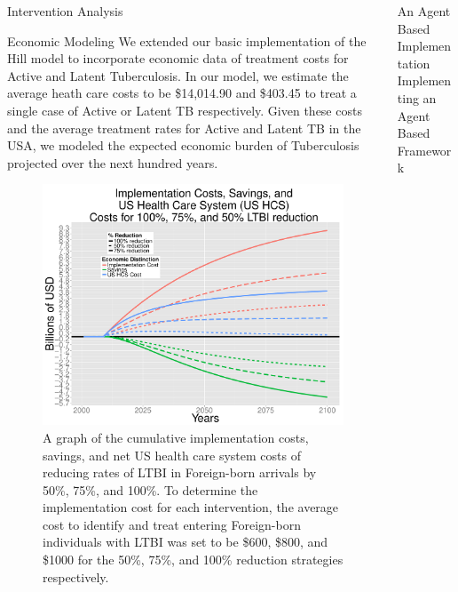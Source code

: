 \documentclass[final]{beamer}
\begin{document}
\begin{frame}
\begin{columns}
\begin{column}{.3\textwidth}
\begin{block}{Intervention Analysis}
\begin{figure}[h]
          \label{fig:redEnLTBI_costs}
        \end{figure}
      \end{block}
      \begin{block}{Economic Modeling}
        We extended our basic implementation of the Hill model to incorporate
        economic data of treatment costs for Active and Latent Tuberculosis.  
        In our model, we estimate the average heath care costs to be \$14,014.90
        and \$403.45 to treat a single case of Active or Latent TB respectively.  
        Given these costs and the average treatment rates for Active and Latent
        TB in the USA, we modeled the expected economic burden of Tuberculosis
        projected over the next hundred years.  

        \begin{figure}[h]
          \begin{center}
            \includegraphics[scale=1]{EnLTBIRedGroupCost.pdf}
          \end{center}
          \caption{A graph of the cumulative implementation costs, savings, and 
                       net US health care system costs of reducing rates of LTBI in
                       Foreign-born arrivals by 50\%, 75\%, and 100\%.  To determine the 
                       implementation cost for each intervention, the average cost
                       to identify and treat entering Foreign-born individuals with LTBI
                       was set to be \$600, \$800, and \$1000 for the 50\%, 75\%, 
                       and 100\% reduction strategies respectively.}
          \label{fig:redEnLTBI_costs}
        \end{figure}
      \end{block}
    \end{column}
    \begin{column}{.3\textwidth}
      \begin{block}{An Agent Based Implementation}
        Implementing an Agent Based Framework
      \end{block}
    \end{column}
  \end{columns}
\end{frame}
\end{document}
